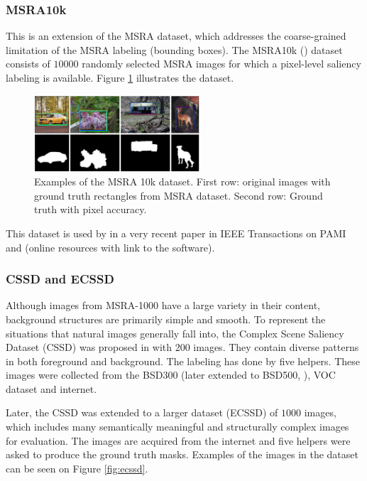 \subsubsection{MSRA10k}
This is an extension of the MSRA dataset, which  addresses the coarse-grained limitation of the MSRA labeling (bounding boxes). The MSRA10k (\cite{msra10k_db}) dataset consists of $10000$ randomly selected MSRA images for which a pixel-level saliency labeling is available. Figure \ref{fig:msra10k} illustrates the dataset. 
\begin{figure}[h]
\begin{center}
\includegraphics[width=0.55\textwidth]{fig/MSRA10k}
\end{center}
\caption{Examples of the MSRA 10k dataset. First row: original images with ground truth rectangles from MSRA dataset. Second row: Ground truth with pixel accuracy.}
\label{fig:msra10k}
\end{figure}
This dataset is used by in a very recent paper in IEEE Transactions on PAMI \cite{ChengPAMI2015} and \cite{chengPAMIUrl} (online resources with link to the software). 

\subsubsection{CSSD and ECSSD}\label{subsec:cssd}
Although images from MSRA-1000 \cite{LCAV-CONF-2009-012} have a large variety in their content, background structures are primarily simple and smooth. To represent the situations that natural images generally fall into, the Complex Scene Saliency Dataset (CSSD) \cite{cssd_db} was proposed in \cite{YanCVPR2013} with $200$ images. They contain diverse patterns in both foreground and background. The labeling has done by five  helpers. These images were collected from the BSD300 (later extended to BSD500, \cite{bsd300/500_db}), VOC dataset \cite{voc_db} and internet.

Later, the CSSD was extended to a larger dataset (ECSSD) of $1000$ images, which includes many semantically meaningful and structurally complex images for evaluation. The images are acquired from the internet and five helpers were asked to produce the ground truth masks. Examples of the images in the dataset can be seen on Figure \ref{fig:ecssd}.

